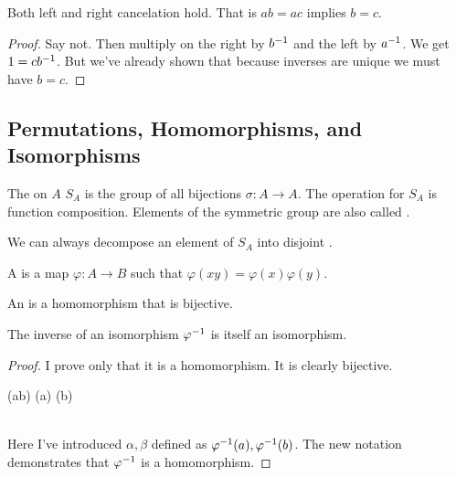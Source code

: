 \documentclass[11pt, oneside]{amsart}
\begin{document}
\begin{proposition}
  Both left and right cancelation hold. That is $ab = ac$ implies $b =
  c$.
\end{proposition}

\begin{proof}
  Say not. Then multiply on the right by ${b}^{-1}$ and the left by
  ${a}^{-1}$. We get $1 = c {b}^{-1}$. But we've already shown that
  because inverses are unique we must have $b = c$.
\end{proof}

\subsection{Permutations, Homomorphisms, and Isomorphisms}

\begin{definition}
  The  on $A$ $S_A$ is the group of all
  bijections $\sigma: A \to A$. The operation for $S_A$ is function
  composition. Elements of the symmetric group are also called
  .
\end{definition}

\begin{proposition}
  We can always decompose an element of $S_A$ into disjoint
  .
\end{proposition}

\begin{definition}
  A  is a map $\varphi: A \to B$ such that
  $\varphi(xy) = \varphi(x) \varphi(y)$.

  An  is a homomorphism that is bijective.
\end{definition}

\begin{proposition}
  The inverse of an isomorphism ${\varphi}^{-1}$ is itself an
  isomorphism.
\end{proposition}

\begin{proof}
  I prove only that it is a homomorphism. It is clearly bijective.

  \begin{nedqn}
    \varphi(ab)
  \eqcol
    \varphi(a) \varphi(b)
  \\
    \inv{\varphi}
  \eqcol
    \inv{\varphi}
  \\
    \alpha \beta
  \eqcol
    \inv{\varphi}\parens{\alpha \beta}
  \end{nedqn}

  \noindent
  Here I've introduced $\alpha, \beta$ defined as ${\varphi}^{-1}(a),
  {\varphi}^{-1}(b)$. The new notation demonstrates that ${\varphi}^{-1}$ is
  a homomorphism.
\end{proof}
\end{document}

